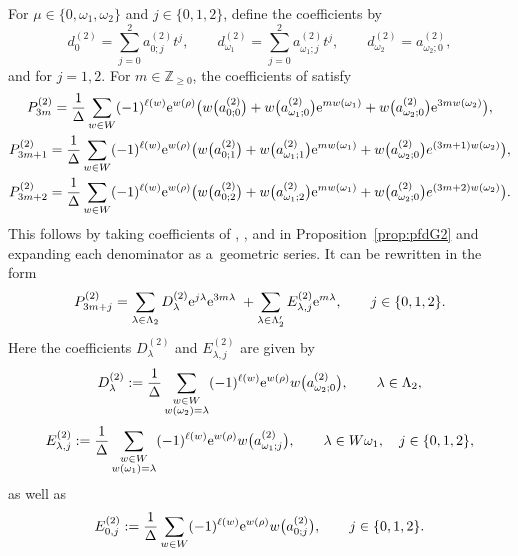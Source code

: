 \documentclass[pdftex]{sigma}
\numberwithin{equation}{section}
\theoremstyle{definition}
\newcommand{\Z}{\mathbb{Z}}
\newcommand{\K}{\mathbb{K}}
\newcommand{\PP}[2]{P^{(#1)}_{#2}}
\begin{document}
For $\mu\in \{0,\omega_1,\omega_2\}$ and $j\in \{0,1,2\}$, define the coefficients \smash{$a^{(2)}_{\mu;j}\in \K$} by
\[
	d^{(2)}_{0}=\sum_{j=0}^{2}a^{(2)}_{0;j}t^j,\qquad
	d^{(2)}_{\omega_1}=\sum_{j=0}^{2}a^{(2)}_{\omega_1;j}t^j,\qquad
	d^{(2)}_{\omega_2}=a^{(2)}_{\omega_2;0},
\]
and  for $j=1,2$.
For $m\in \Z_{\geq 0}$, the coefficients of \smash{$\mathcal{P}^{(2)}(t)=\sum_{m=0}^{\infty}\PP2m t^m$} satisfy
\begin{gather*}
\PP{2}{3m} =
\frac{1}{\Delta}\sum_{w\in W}(-1)^{\ell(w)}{\rm e}^{w(\rho)}
\bigl(
	w\bigl(a^{(2)}_{0;0}\bigr)
	+w\bigl(a^{(2)}_{\omega_1;0}\bigr){\rm e}^{m w(\omega_1)}
	+w\bigl(a^{(2)}_{\omega_2;0}\bigr){\rm e}^{3m w(\omega_2)}
\bigr),\\
\PP{2}{3m+1} =
\frac{1}{\Delta}\sum_{w\in W}(-1)^{\ell(w)}{\rm e}^{w(\rho)}
\bigl(
	w\bigl(a^{(2)}_{0;1}\bigr)
	+w\bigl(a^{(2)}_{\omega_1;1}\bigr){\rm e}^{m w(\omega_1)}
	+w\bigl(a^{(2)}_{\omega_2;0}\bigr)e^{(3m+1) w(\omega_2)}
\bigr),\\
\PP{2}{3m+2} =
\frac{1}{\Delta}\sum_{w\in W}(-1)^{\ell(w)}{\rm e}^{w(\rho)}
\bigl(
	w\bigl(a^{(2)}_{0;2}\bigr)
	+w\bigl(a^{(2)}_{\omega_1;2}\bigr){\rm e}^{m w(\omega_1)}
	+w\bigl(a^{(2)}_{\omega_2;0}\bigr)e^{(3m+2) w(\omega_2)}
\bigr).
\end{gather*}
This follows by taking coefficients of , , and  in Proposition~\ref{prop:pfdG2} and expanding each denominator as a~geometric series.
It can be rewritten in the form
\begin{equation}\label{eqn:pp2}
\PP{2}{3m+j}=\sum_{\lambda\in \Lambda_2}D^{(2)}_{\lambda}{\rm e}^{j\lambda}{\rm e}^{3m\lambda}
\;+\sum_{\lambda\in \Lambda'_2}E^{(2)}_{\lambda,j}{\rm e}^{m\lambda},
\qquad j\in \{0,1,2\}.
\end{equation}
Here the coefficients $D^{(2)}_{\lambda}$ and $E^{(2)}_{\lambda,j}$ are given by
\[
D^{(2)}_{\lambda}:=
\frac{1}{\Delta}\sum_{\substack{w\in W\\ w(\omega_2)=\lambda}}
(-1)^{\ell(w)}{\rm e}^{w(\rho)}w\bigl(a^{(2)}_{\omega_2;0}\bigr),
\qquad \lambda\in \Lambda_2,
\]
\[
E^{(2)}_{\lambda,j}:=
\frac{1}{\Delta}\sum_{\substack{w\in W\\ w(\omega_1)=\lambda}}
(-1)^{\ell(w)}{\rm e}^{w(\rho)}w\bigl(a^{(2)}_{\omega_1;j}\bigr),
\qquad \lambda\in W\omega_1,\quad j\in \{0,1,2\},
\]
as well as
\[
E^{(2)}_{0,j}:=
\frac{1}{\Delta}\sum_{w\in W}
(-1)^{\ell(w)}{\rm e}^{w(\rho)}w\bigl(a^{(2)}_{0;j}\bigr),
\qquad j\in \{0,1,2\}.
\]
\end{document}
